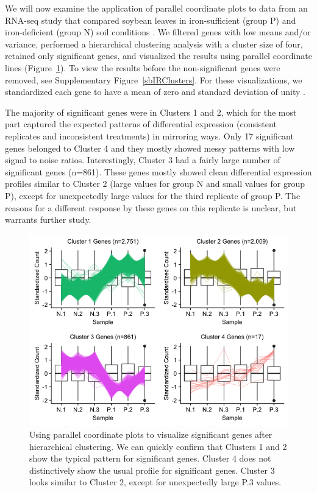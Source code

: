 \documentclass[11pt,a4paper,oldfontcommands,openany]{memoir}
\numberwithin{equation}{section} %
\begin{document}
We will now examine the application of parallel coordinate plots to data from an RNA-seq study that compared soybean leaves in iron-sufficient (group P) and iron-deficient (group N) soil conditions \citep{Lauter16}. We filtered genes with low means and/or variance, performed a hierarchical clustering analysis with a cluster size of four, retained only significant genes, and visualized the results using parallel coordinate lines (Figure~\ref{sbIRClustersSig}). To view the results before the non-significant genes were removed, see Supplementary Figure~\ref{sbIRClusters}. For these visualizations, we standardized each gene to have a mean of zero and standard deviation of unity \citep{Chandrasekhar, deSouto}.

The majority of significant genes were in Clusters 1 and 2, which for the most part captured the expected patterns of differential expression (consistent replicates and inconsistent treatments) in mirroring ways. Only 17 significant genes belonged to Cluster 4 and they mostly showed messy patterns with low signal to noise ratios. Interestingly, Cluster 3 had a fairly large number of significant genes (n=861). These genes mostly showed clean differential expression profiles similar to Cluster 2 (large values for group N and small values for group P), except for unexpectedly large values for the third replicate of group P. The reasons for a different response by these genes on this replicate is unclear, but warrants further study.

\begin{figure}[!tpb]
\begin{framed}
\centerline{\includegraphics[width=\columnwidth]{MakeFigures/sbIRClustersSig.jpg}}
\end{framed}
\caption{Using parallel coordinate plots to visualize significant genes after hierarchical clustering. We can quickly confirm that Clusters 1 and 2 show the typical pattern for significant genes. Cluster 4 does not distinctively show the usual profile for significant genes. Cluster 3 looks similar to Cluster 2, except for unexpectedly large P.3 values.
\label{sbIRClustersSig}}
\end{figure}
\end{document}

